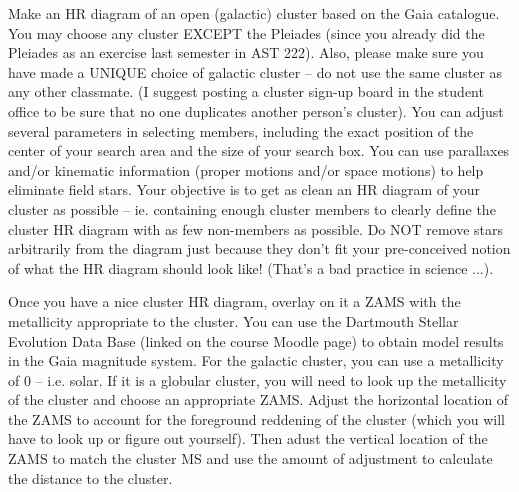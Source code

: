 \documentclass[12pt]{article}
\newenvironment{problem}[2][Problem]{\begin{trivlist}
\item[\hskip \labelsep {\bfseries #1}\hskip \labelsep {\bfseries #2.}]}{\end{trivlist}}
\begin{document}
\begin{problem}{1 \& 2}
  Make an HR diagram of an open (galactic) cluster based on the Gaia catalogue. You may choose any cluster EXCEPT the Pleiades (since you already did the Pleiades as an exercise last semester in AST 222). Also, please make sure you have made a UNIQUE choice of galactic cluster -- do not use the same cluster as any other classmate. (I suggest posting a cluster sign-up board in the student office to be sure that no one duplicates another person's cluster). You can adjust several parameters in selecting members, including the exact position of the center of your search area and the size of your search box. You can use parallaxes and/or kinematic information (proper motions and/or space motions) to help eliminate field stars. Your objective is to get as clean an HR diagram of your cluster as possible -- ie. containing enough cluster members to clearly define the cluster HR diagram with as few non-members as possible. Do NOT remove stars arbitrarily from the diagram just because they don't fit your pre-conceived notion of what the HR diagram should look like! (That's a bad practice in science ...).

  Once you have a nice cluster HR diagram, overlay on it a ZAMS with the metallicity appropriate to the cluster. You can use the Dartmouth Stellar Evolution Data Base (linked on the course Moodle page) to obtain model results in the Gaia magnitude system. For the galactic cluster, you can use a metallicity of 0 -- i.e. solar. If it is a globular cluster, you will need to look up the metallicity of the cluster and choose an appropriate ZAMS. Adjust the horizontal location of the ZAMS to account for the foreground reddening of the cluster (which you will have to look up or figure out yourself). Then adust the vertical location of the ZAMS to match the cluster MS and use the amount of adjustment to calculate the distance to the cluster.

\end{problem}
\end{document}
